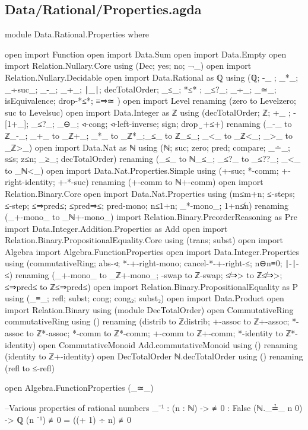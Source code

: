 \documentclass[11pt,a4paper]{article}
\begin{document}
\subsection{Data/Rational/Properties.agda}
\begin{code}
module Data.Rational.Properties where

open import Function
open import Data.Sum
open import Data.Empty
open import Relation.Nullary.Core using (Dec; yes; no; ¬_)
open import Relation.Nullary.Decidable
open import Data.Rational as ℚ using (ℚ; -_ ; _*_; _÷suc_;
  _-_; _+_; ∣_∣; decTotalOrder; _≤_; *≤* ; _≤?_; _÷_; _≃_;
  isEquivalence; drop-*≤*; ≡⇒≃ )
open import Level renaming (zero to Levelzero; suc to Levelsuc)
open import Data.Integer as ℤ using (decTotalOrder; ℤ; +_ ;
  -[1+_]; _≤?_; _⊖_; ◃-cong; ◃-left-inverse; sign; drop‿+≤+) renaming 
  (_-_ to ℤ_-_; _+_ to _ℤ+_; _*_ to  _ℤ*_;_≤_ to ℤ_≤_; _<_ to _ℤ<_;
   _>_ to _ℤ>_)
open import Data.Nat as ℕ using (ℕ; suc; zero; pred; compare;
  _∸_; s≤s; z≤n; _≥_; decTotalOrder)
    renaming (_≤_ to ℕ_≤_; _≤?_ to _≤??_; _<_ to _ℕ<_)
open import Data.Nat.Properties.Simple using (+-suc;
  *-comm; +-right-identity; +-*-suc)
  renaming (+-comm to ℕ+-comm)
open import Relation.Binary.Core
open import Data.Nat.Properties using (m≤m+n; ≤-steps;
  ≤-step; ≤⇒pred≤; ≤pred⇒≤; pred-mono; n≤1+n; _*-mono_; 1+n≰n)
  renaming (_+-mono_ to _ℕ+-mono_)
import Relation.Binary.PreorderReasoning as Pre
import Data.Integer.Addition.Properties as Add
open import Relation.Binary.PropositionalEquality.Core
  using (trans; subst)
open import Algebra
import Algebra.FunctionProperties
open import Data.Integer.Properties using (commutativeRing; abs-◃;
  *-+-right-mono; cancel-*-+-right-≤; n⊖n≡0; ∣-∣-≤)
  renaming (_+-mono_ to _ℤ+-mono_; -swap to ℤ-swap; ≰⇒> to ℤ≰⇒>;
  ≤⇒pred≤ to ℤ≤⇒pred≤)
open import Relation.Binary.PropositionalEquality as P using (_≡_; refl; 
  subst; cong; cong₂; subst₂)
open import Data.Product
open import Relation.Binary using (module DecTotalOrder)
open CommutativeRing commutativeRing
  using ()
  renaming (distrib to ℤdistrib; +-assoc to ℤ+-assoc; *-assoc to ℤ*-assoc;
  *-comm to ℤ*-comm; +-comm to ℤ+-comm; *-identity to ℤ*-identity)
open CommutativeMonoid Add.commutativeMonoid
  using ()
  renaming (identity to ℤ+-identity)
open DecTotalOrder ℕ.decTotalOrder using () renaming (refl to ≤-refl)

open Algebra.FunctionProperties (_≃_)

--Various properties of rational numbers
_⁻¹ : (n : ℕ) -> {≢0 : False (ℕ._≟_ n 0)} -> ℚ
(n ⁻¹) {≢0} = ((+ 1) ÷ n) {≢0}


\end{code}
\end{document}

